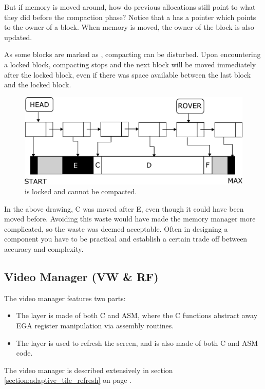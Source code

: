 \documentclass[book.tex]{subfiles}
\begin{document}
 \par
But if memory is moved around, how do previous allocations still point to what they did before the compaction phase? Notice that a  has a  pointer which points to the owner of a block.  When memory is moved, the owner of the block is also updated.\\
\par
As some blocks are marked as , compacting can be disturbed. Upon encountering a locked block, compacting stops and the next block will be moved immediately after the locked block, even if there was space available between the last block and the locked block.\\
   \par
\begin{figure}[H]
\centering
 \includegraphics[width=\textwidth]{imgs/drawings/mm_bad_compact.eps}
 \caption{ is locked and cannot be compacted.}
 \end{figure}
 \par
  In the above drawing, C was moved after E, even though it could have been moved before. Avoiding this waste would have made the memory manager more complicated, so the waste was deemed acceptable. Often in designing a component you have to be practical and establish a certain trade off between accuracy and complexity.\\
  \par
  
  
  


\subsection{Video Manager (VW \& RF)}
The video manager features two parts:
\begin{itemize}
\item The  layer is made of both C and ASM, where the C functions abstract away EGA register manipulation via assembly routines. 
\item The  layer is used to refresh the screen, and is also made of both C and ASM code.
\end{itemize}
The video manager is described extensively in section \ref{section:adaptive_tile_refresh} on page \pageref{section:adaptive_tile_refresh}.
\end{document}
